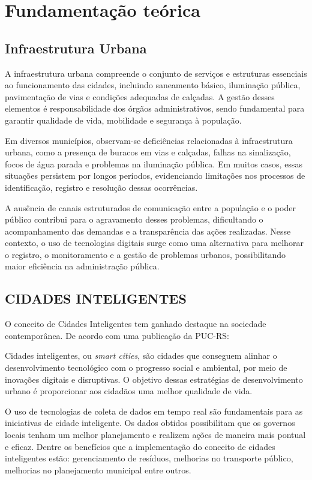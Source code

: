 \chapter{Fundamentação teórica}\label{cap_trabalho_academico}

\section{Infraestrutura Urbana}
A infraestrutura urbana compreende o conjunto de serviços e estruturas essenciais ao funcionamento das cidades, incluindo saneamento básico, iluminação pública, pavimentação de vias e condições adequadas de calçadas. A gestão desses elementos é responsabilidade dos órgãos administrativos, sendo fundamental para garantir qualidade de vida, mobilidade e segurança à população.

Em diversos municípios, observam-se deficiências relacionadas à infraestrutura urbana, como a presença de buracos em vias e calçadas, falhas na sinalização, focos de água parada e problemas na iluminação pública. Em muitos casos, essas situações persistem por longos períodos, evidenciando limitações nos processos de identificação, registro e resolução dessas ocorrências.

A ausência de canais estruturados de comunicação entre a população e o poder público contribui para o agravamento desses problemas, dificultando o acompanhamento das demandas e a transparência das ações realizadas. Nesse contexto, o uso de tecnologias digitais surge como uma alternativa para melhorar o registro, o monitoramento e a gestão de problemas urbanos, possibilitando maior eficiência na administração pública.


\section{CIDADES INTELIGENTES}
O conceito de Cidades Inteligentes tem ganhado destaque na sociedade contemporânea. De acordo com uma publicação da PUC-RS: 
\begin{citacao}
    Cidades inteligentes, ou \textit{smart cities}, são cidades que conseguem alinhar o desenvolvimento tecnológico com o progresso social e ambiental, por meio de inovações digitais e disruptivas. O objetivo dessas estratégias de desenvolvimento urbano é proporcionar aos cidadãos uma melhor qualidade de vida. \cite{puc_cidades_inteligentes}
\end{citacao}

O uso de tecnologias de coleta de dados em tempo real são fundamentais para as iniciativas de cidade inteligente. Os dados obtidos possibilitam que os governos locais tenham um melhor planejamento e realizem ações de maneira mais pontual e eficaz. Dentre os benefícios que a implementação do conceito de cidades inteligentes estão: gerenciamento de resíduos, melhorias no transporte público, melhorias no planejamento municipal entre outros. \cite{cidadeintelignte_ibm}

